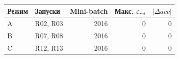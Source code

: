 \begin{tabular}{llrrr}
\toprule
Режим & Запуски & Mini-batch & Макс. $\varepsilon_{rel}$ & $|\Delta acc|$ \\
\midrule
A & R02, R03 & 2016 & 0 & 0 \\
B & R07, R08 & 2016 & 0 & 0 \\
C & R12, R13 & 2016 & 0 & 0 \\
\bottomrule
\end{tabular}
